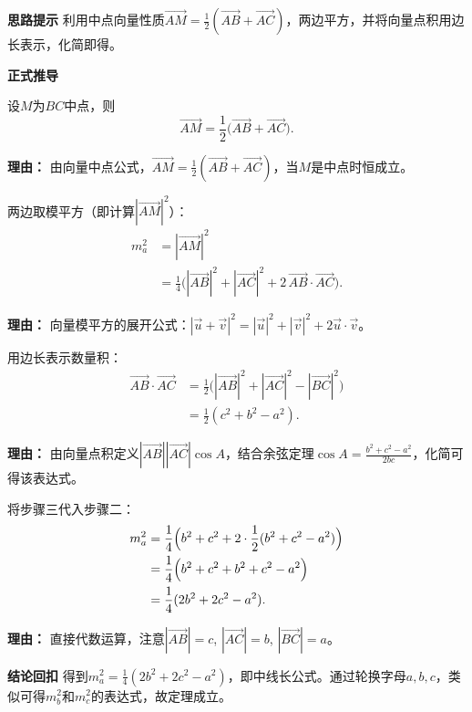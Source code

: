 \begin{proofbox}
	\textbf{\textcolor{CProof}{思路提示}}
	利用中点向量性质$\overrightarrow{AM} = \frac12(\overrightarrow{AB} + \overrightarrow{AC})$，两边平方，并将向量点积用边长表示，化简即得。

	\medskip
	\textbf{\textcolor{CProof}{正式推导}}
	\begin{description}[style=nextline, leftmargin=2.8em, labelsep=0.5em, itemsep=0.55em]
		\item[\textbf{步骤一（中点向量表示）：}]
			设$M$为$BC$中点，则
			\[
				\overrightarrow{AM} = \frac12 \bigl( \overrightarrow{AB} + \overrightarrow{AC} \bigr) .
			\]
			\par\textbf{理由：} 由向量中点公式，$\overrightarrow{AM} = \frac12(\overrightarrow{AB} + \overrightarrow{AC})$，当$M$是中点时恒成立。
		\item[\textbf{步骤二（平方展开）：}]
			两边取模平方（即计算$|\overrightarrow{AM}|^2$）：
			\[
				\begin{aligned}
					m_a^2 &= |\overrightarrow{AM}|^2 \\ &= \frac14 \bigl( |\overrightarrow{AB}|^2 + |\overrightarrow{AC}|^2 + 2\, \overrightarrow{AB}\cdot\overrightarrow{AC} \bigr) .
			\end{aligned}
			\]
			\par\textbf{理由：} 向量模平方的展开公式：$|\vec{u}+\vec{v}|^2 = |\vec{u}|^2 + |\vec{v}|^2 + 2\vec{u}\cdot\vec{v}$。
		\item[\textbf{步骤三（数量积转边长）：}]
			用边长表示数量积：
			\[
				\begin{aligned}
					\overrightarrow{AB}\cdot\overrightarrow{AC} &= \frac12 \bigl( |\overrightarrow{AB}|^2 + |\overrightarrow{AC}|^2 - |\overrightarrow{BC}|^2 \bigr) \\ &= \frac12 (c^2 + b^2 - a^2) .
			\end{aligned}
			\]
			\par\textbf{理由：} 由向量点积定义$|\overrightarrow{AB}||\overrightarrow{AC}|\cos A$，结合余弦定理$\cos A=\frac{b^2+c^2-a^2}{2bc}$，化简可得该表达式。
		\item[\textbf{步骤四（代入化简）：}]
			将步骤三代入步骤二：
			\[
				\begin{aligned}
					m_a^2 &= \frac14 \Bigl( b^2 + c^2 + 2\cdot\frac12(b^2 + c^2 - a^2) \Bigr) \\ &= \frac14 \Bigl( b^2 + c^2 + b^2 + c^2 - a^2 \Bigr) \\ &= \frac14 ( 2b^2 + 2c^2 - a^2 ) .
			\end{aligned}
			\]
			\par\textbf{理由：} 直接代数运算，注意$|\overrightarrow{AB}| = c$, $|\overrightarrow{AC}| = b$, $|\overrightarrow{BC}| = a$。
	\end{description}

	\medskip
	\textbf{\textcolor{CProof}{结论回扣}}
	得到$m_a^2 = \frac14(2b^2+2c^2-a^2)$，即中线长公式。通过轮换字母$a,b,c$，类似可得$m_b^2$和$m_c^2$的表达式，故定理成立。
\end{proofbox}
